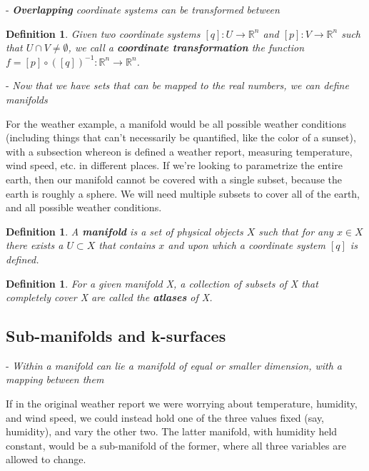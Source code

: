 \documentclass{book}
\newtheorem{defn}[equation]{Definition}
\begin{document}
- \emph{\textbf{Overlapping} coordinate systems can be transformed between}



\begin{defn}
	Given two coordinate systems  $[q] : U \to \mathbb{R}^n$ and $[p] : V \to \mathbb{R}^n$ such that $U \cap V \neq \emptyset$, we call a \textbf{coordinate transformation} the function $f = [p] \circ ([q])^{-1} : \mathbb{R}^n \to \mathbb{R}^n$.
\end{defn}




- \emph{Now that we have sets that can be mapped to the real numbers, we can define manifolds}

For the weather example, a manifold would be all possible weather conditions (including things that can't necessarily be quantified, like the color of a sunset), with a subsection whereon is defined a weather report, measuring temperature, wind speed, etc. in different places. If we're looking to parametrize the entire earth, then our manifold cannot be covered with a single subset, because the earth is roughly a sphere. We will need multiple subsets to cover all of the earth, and all possible weather conditions. 


 
\begin{defn}
	A \textbf{manifold} is a set of physical objects $X$ such that for any $x \in X$ there exists a $U \subset X$ that contains $x$ and upon which a coordinate system $[q]$ is defined.
\end{defn}

\begin{defn}
	For a given manifold X, a collection of subsets of X that completely cover X are called the \textbf{atlases} of X. 
\end{defn}



\subsection{Sub-manifolds and k-surfaces}

- \emph{Within a manifold can lie a manifold of equal or smaller dimension, with a mapping between them}

If in the original weather report we were worrying about temperature, humidity, and wind speed, we could instead hold one of the three values fixed (say, humidity), and vary the other two. The latter manifold, with humidity held constant, would be a sub-manifold of the former, where all three variables are allowed to change.  
\end{document}
